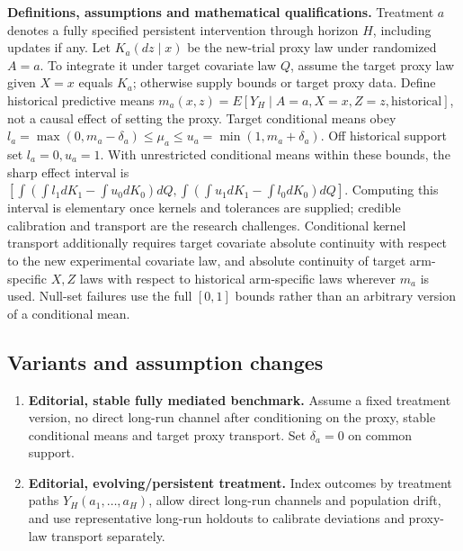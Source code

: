 \documentclass[11pt,a4paper]{article}
\begin{document}
\textbf{Definitions, assumptions and mathematical qualifications.} Treatment \(a\) denotes a fully specified persistent intervention through horizon \(H\), including updates if any. Let \(K_a(dz\mid x)\) be the new-trial proxy law under randomized \(A=a\). To integrate it under target covariate law \(Q\), assume the target proxy law given \(X=x\) equals \(K_a\); otherwise supply bounds or target proxy data. Define historical predictive means \(m_a(x,z)=E[Y_H\mid A=a,X=x,Z=z,\text{historical}]\), not a causal effect of setting the proxy. Target conditional means obey \(l_a=\max(0,m_a-\delta_a)\leq\mu_a\leq u_a=\min(1,m_a+\delta_a)\). Off historical support set \(l_a=0,u_a=1\). With unrestricted conditional means within these bounds, the sharp effect interval is \([\int(\int l_1dK_1-\int u_0dK_0)dQ,\int(\int u_1dK_1-\int l_0dK_0)dQ]\). Computing this interval is elementary once kernels and tolerances are supplied; credible calibration and transport are the research challenges. Conditional kernel transport additionally requires target covariate absolute continuity with respect to the new experimental covariate law, and absolute continuity of target arm-specific \(X,Z\) laws with respect to historical arm-specific laws wherever \(m_a\) is used. Null-set failures use the full \([0,1]\) bounds rather than an arbitrary version of a conditional mean.
\subsection*{Variants and assumption changes}
\begin{enumerate}
\item \textbf{Editorial, stable fully mediated benchmark.} Assume a fixed treatment version, no direct long-run channel after conditioning on the proxy, stable conditional means and target proxy transport. Set \(\delta_a=0\) on common support.
\item \textbf{Editorial, evolving/persistent treatment.} Index outcomes by treatment paths \(Y_H(a_1,\ldots,a_H)\), allow direct long-run channels and population drift, and use representative long-run holdouts to calibrate deviations and proxy-law transport separately.
\end{enumerate}
\end{document}
